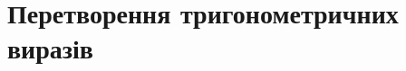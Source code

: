 \documentclass{book}
\begin{document}
%
%
\chapter{Перетворення тригонометричних виразів}

\end{document}
